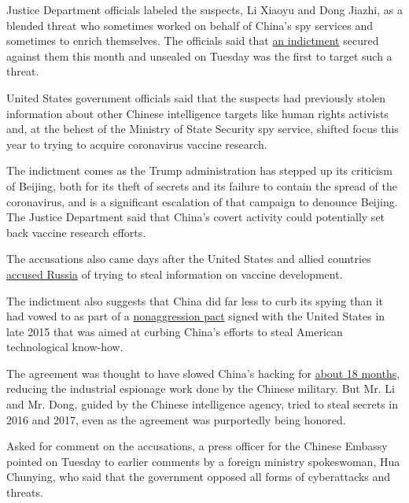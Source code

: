 Justice Department officials labeled the suspects, Li Xiaoyu and Dong
Jiazhi, as a blended threat who sometimes worked on behalf of China's
spy services and sometimes to enrich themselves. The officials said that
\href{https://www.courtlistener.com/recap/gov.uscourts.waed.91446/gov.uscourts.waed.91446.15.0.pdf}{an
indictment} secured against them this month and unsealed on Tuesday was
the first to target such a threat.

United States government officials said that the suspects had previously
stolen information about other Chinese intelligence targets like human
rights activists and, at the behest of the Ministry of State Security
spy service, shifted focus this year to trying to acquire coronavirus
vaccine research.

The indictment comes as the Trump administration has stepped up its
criticism of Beijing, both for its theft of secrets and its failure to
contain the spread of the coronavirus, and is a significant escalation
of that campaign to denounce Beijing. The Justice Department said that
China's covert activity could potentially set back vaccine research
efforts.

The accusations also came days after the United States and allied
countries
\href{https://www.nytimes3xbfgragh.onion/2020/07/16/us/politics/vaccine-hacking-russia.html}{accused
Russia} of trying to steal information on vaccine development.

The indictment also suggests that China did far less to curb its spying
than it had vowed to as part of a
\href{https://www.nytimes3xbfgragh.onion/2015/09/26/world/asia/xi-jinping-white-house.html}{nonaggression
pact} signed with the United States in late 2015 that was aimed at
curbing China's efforts to steal American technological know-how.

The agreement was thought to have slowed China's hacking for
\href{https://www.nytimes3xbfgragh.onion/2018/11/29/us/politics/china-trump-cyberespionage.html}{about
18 months}, reducing the industrial espionage work done by the Chinese
military. But Mr. Li and Mr. Dong, guided by the Chinese intelligence
agency, tried to steal secrets in 2016 and 2017, even as the agreement
was purportedly being honored.

Asked for comment on the accusations, a press officer for the Chinese
Embassy pointed on Tuesday to earlier comments by a foreign ministry
spokeswoman, Hua Chunying, who said that the government opposed all
forms of cyberattacks and threats.

